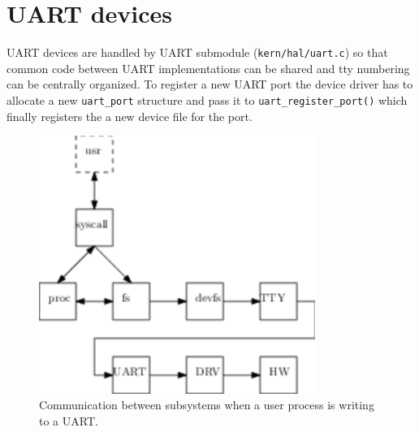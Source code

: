 \section{UART devices}

UART devices are handled by UART submodule (\verb+kern/hal/uart.c+) so that
common code between UART implementations can be shared and tty numbering can
be centrally organized. To register a new UART port the device driver has to
allocate a new \verb+uart_port+ structure and pass it to
\verb+uart_register_port()+ which finally registers the a new device file for
the port.

\begin{figure}
  \center
  \includegraphics[width=9cm]{pics/uart}
  \caption{Communication between subsystems when a user process is writing to a UART.}
  \label{figure:fsuart}
\end{figure}


